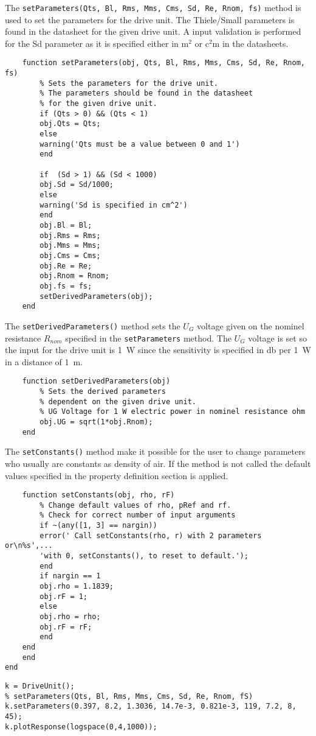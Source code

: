 The \texttt{setParameters(Qts, Bl, Rms, Mms, Cms, Sd, Re, Rnom, fs)} 
\newline method is used to set the parameters for the drive unit.
The Thiele/Small parameters is found in the datasheet for the given drive unit. 
A input validation is performed for the Sd parameter as it is specified either in $\si{\square\meter}$ or $\si{\square\centi\meter}$ in the datasheets.
\begin{verbatim}
	function setParameters(obj, Qts, Bl, Rms, Mms, Cms, Sd, Re, Rnom, fs)
	    % Sets the parameters for the drive unit.
	    % The parameters should be found in the datasheet
	    % for the given drive unit. 
	    if (Qts > 0) && (Qts < 1)
		obj.Qts = Qts;
	    else 
		warning('Qts must be a value between 0 and 1')
	    end
	
	    if  (Sd > 1) && (Sd < 1000)
		obj.Sd = Sd/1000;
	    else
		warning('Sd is specified in cm^2')
	    end
	    obj.Bl = Bl;
	    obj.Rms = Rms;
	    obj.Mms = Mms;
	    obj.Cms = Cms;
	    obj.Re = Re;
	    obj.Rnom = Rnom;
	    obj.fs = fs;
	    setDerivedParameters(obj);
	end
\end{verbatim}

The \texttt{setDerivedParameters()} method sets the $U_G$ voltage given on the nominel resistance $R_{nom}$ specified in the \texttt{setParameters} method. 
The $U_G$ voltage is set so the input for the drive unit is \SI{1}{\watt} since the sensitivity is specified in \si{\decibel} per \SI{1}{\watt} in a distance of \SI{1}{\meter}.
\begin{verbatim}
	function setDerivedParameters(obj)
	    % Sets the derived parameters 
	    % dependent on the given drive unit.
	    % UG Voltage for 1 W electric power in nominel resistance ohm
	    obj.UG = sqrt(1*obj.Rnom);
	end
\end{verbatim}

The \texttt{setConstants()} method make it possible for the user to change parameters who usually are constants as density of air. 
If the method is not called the default values specified in the property definition section is applied.   
\begin{verbatim}
	function setConstants(obj, rho, rF)
	    % Change default values of rho, pRef and rf.	
	    % Check for correct number of input arguments
	    if ~(any([1, 3] == nargin))
		error(' Call setConstants(rho, r) with 2 parameters or\n%s',...
		'with 0, setConstants(), to reset to default.');
	    end
	    if nargin == 1
		obj.rho = 1.1839;
		obj.rF = 1;
	    else
		obj.rho = rho;
		obj.rF = rF;
	    end
	end
    end
end
\end{verbatim}


\begin{verbatim}
k = DriveUnit();
% setParameters(Qts, Bl, Rms, Mms, Cms, Sd, Re, Rnom, fS)
k.setParameters(0.397, 8.2, 1.3036, 14.7e-3, 0.821e-3, 119, 7.2, 8, 45);
k.plotResponse(logspace(0,4,1000));
\end{verbatim}